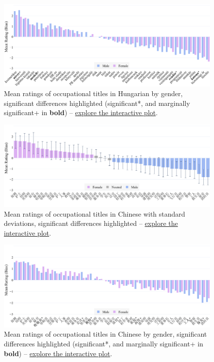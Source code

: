 \documentclass[11pt]{article}
\begin{document}
\begin{figure}[tbp]
  \centering
  \includegraphics[width=\linewidth]{../occupations_hu_gender}
  \caption{Mean ratings of occupational titles in Hungarian by gender, significant differences highlighted (significant*, and marginally significant+ in \textbf{bold}) -- \href{https://anonymous.4open.science/api/repo/occupational-gender-bias/file/occupations_hu_gender.html?v=cf836c31}{explore the interactive plot}.}
  \label{fig:occupations_hu_gender}
\end{figure}



\begin{figure}[!ht]
  \centering
  \includegraphics[width=\linewidth]{../occupations_zh}
  \caption{Mean ratings of occupational titles in Chinese with standard deviations, significant differences highlighted -- \href{https://anonymous.4open.science/api/repo/occupational-gender-bias/file/occupations_zh.html?v=9fe887c1}{explore the interactive plot}.}
  \label{fig:occupations_zh}
\end{figure}

\begin{figure}[tbp]
  \centering
  \includegraphics[width=\linewidth]{../occupations_zh_gender}
  \caption{Mean ratings of occupational titles in Chinese by gender, significant differences highlighted (significant*, and marginally significant+ in \textbf{bold}) -- \href{https://anonymous.4open.science/api/repo/occupational-gender-bias/file/occupations_zh_gender.html?v=99428eda}{explore the interactive plot}.}
  \label{fig:occupations_zh_gender}
\end{figure}
\end{document}
